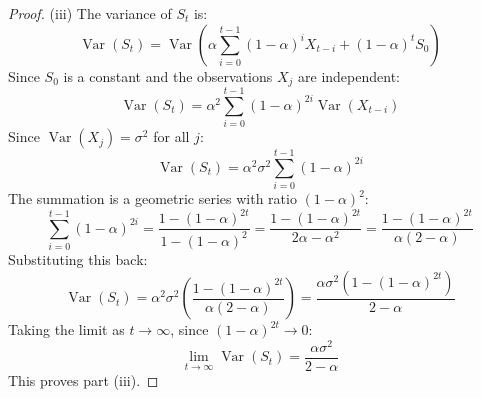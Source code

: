 \documentclass[11pt,a4paper]{article}
\theoremstyle{plain}
\theoremstyle{definition}
\theoremstyle{remark}
\newcommand{\Var}{\operatorname{Var}}
\begin{document}
\begin{proof}
(iii) The variance of $S_t$ is:
$$\Var(S_t) = \Var\left( \alpha \sum_{i=0}^{t-1} (1-\alpha)^i X_{t-i} + (1-\alpha)^t S_0 \right)$$
Since $S_0$ is a constant and the observations $X_j$ are independent:
$$\Var(S_t) = \alpha^2 \sum_{i=0}^{t-1} (1-\alpha)^{2i} \Var(X_{t-i})$$
Since $\Var(X_j) = \sigma^2$ for all $j$:
$$\Var(S_t) = \alpha^2 \sigma^2 \sum_{i=0}^{t-1} (1-\alpha)^{2i}$$
The summation is a geometric series with ratio $(1-\alpha)^2$:
$$\sum_{i=0}^{t-1} (1-\alpha)^{2i} = \frac{1 - (1-\alpha)^{2t}}{1 - (1-\alpha)^2} = \frac{1 - (1-\alpha)^{2t}}{2\alpha - \alpha^2} = \frac{1 - (1-\alpha)^{2t}}{\alpha(2-\alpha)}$$
Substituting this back:
$$\Var(S_t) = \alpha^2 \sigma^2 \left( \frac{1 - (1-\alpha)^{2t}}{\alpha(2-\alpha)} \right) = \frac{\alpha \sigma^2 (1 - (1-\alpha)^{2t})}{2-\alpha}$$
Taking the limit as $t \to \infty$, since $(1-\alpha)^{2t} \to 0$:
$$\lim_{t\to\infty} \Var(S_t) = \frac{\alpha\sigma^2}{2-\alpha}$$
This proves part (iii).
\end{proof}
\end{document}
